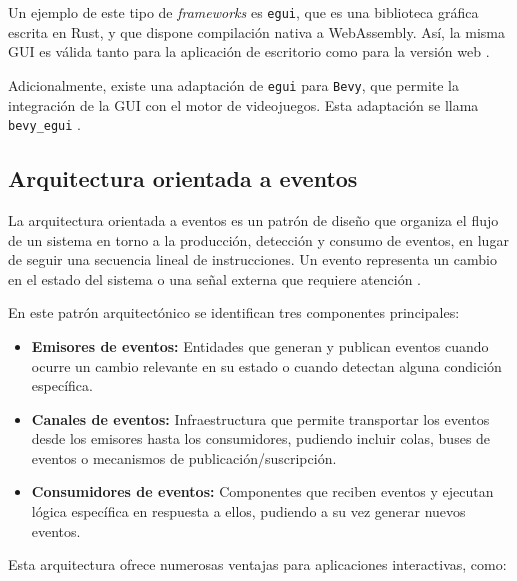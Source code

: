 Un ejemplo de este tipo de \textit{frameworks} es \texttt{egui}, que es una biblioteca gráfica escrita en Rust, y que dispone compilación nativa a WebAssembly. Así, la misma \ac{GUI} es válida tanto para la aplicación de escritorio como para la versión web \autocite{ernerfeldtEmilkEgui2025}.

Adicionalmente, existe una adaptación de \texttt{egui} para \texttt{Bevy}, que permite la integración de la \ac{GUI} con el motor de videojuegos. Esta adaptación se llama \texttt{bevy\_egui} \autocite{Bevy_eguiRust}. 

\subsection{Arquitectura orientada a eventos} \label{subsec:eventos}

La arquitectura orientada a eventos es un patrón de diseño que organiza el flujo de un sistema en torno a la producción, detección y consumo de eventos, en lugar de seguir una secuencia lineal de instrucciones. Un evento representa un cambio en el estado del sistema o una señal externa que requiere atención \autocite{SistemaComponentesEntidad2024}.

En este patrón arquitectónico se identifican tres componentes principales:
\begin{itemize}
    \item \textbf{Emisores de eventos:} Entidades que generan y publican eventos cuando ocurre un cambio relevante en su estado o cuando detectan alguna condición específica.
    
    \item \textbf{Canales de eventos:} Infraestructura que permite transportar los eventos desde los emisores hasta los consumidores, pudiendo incluir colas, buses de eventos o mecanismos de publicación/suscripción.
    
    \item \textbf{Consumidores de eventos:} Componentes que reciben eventos y ejecutan lógica específica en respuesta a ellos, pudiendo a su vez generar nuevos eventos.
\end{itemize}

Esta arquitectura ofrece numerosas ventajas para aplicaciones interactivas, como:

